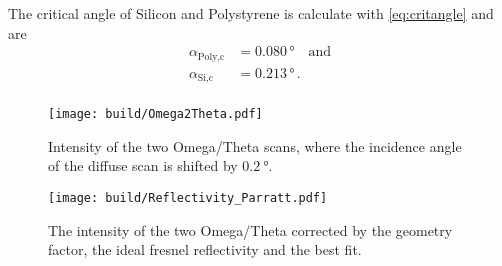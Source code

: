 The critical angle of Silicon and Polystyrene is calculate with \autoref{eq:critangle} and are
\begin{align*}
    \alpha_{\text{Poly}, \text{c}}  &=    0.080 \, \unit{\degree}   \quad \text{and} \\
    \alpha_{\text{Si}, \text{c}}    &=     0.213\, \unit{\degree} \,.    \\
\end{align*}



\begin{figure}[H]
    \centering
    \texttt{[image: build/Omega2Theta.pdf]}
    \caption{Intensity of the two Omega/Theta scans, where the incidence angle of the diffuse scan is shifted by $\SI{0.2}{\degree}$.} 
    \label{fig:Omega2Theta1}
\end{figure}

\begin{figure}[H]
    \centering
    \texttt{[image: build/Reflectivity\_Parratt.pdf]}
    \caption{The intensity of the two Omega/Theta corrected by the geometry factor, the ideal fresnel reflectivity and the best fit.} 
    \label{fig:Omega2Theta2}
\end{figure}
